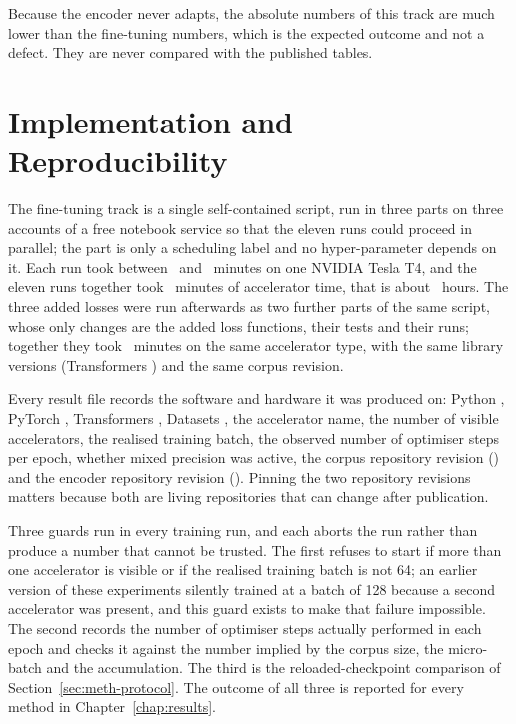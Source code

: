 Because the encoder never adapts, the absolute numbers of this track are much lower than the
fine-tuning numbers, which is the expected outcome and not a defect. They are never compared
with the published tables.

\section{Implementation and Reproducibility}
\label{sec:meth-impl}

The fine-tuning track is a single self-contained script, run in three parts on three accounts
of a free notebook service so that the eleven runs could proceed in parallel; the part is only
a scheduling label and no hyper-parameter depends on it. Each run took between \minAll\ and
\maxAll\ minutes on one NVIDIA Tesla T4, and the eleven runs together took \totalMinutes\
minutes of accelerator time, that is about \totalHours\ hours. The three added losses were run
afterwards as two further parts of the same script, whose only changes are the added loss
functions, their tests and their runs; together they took \nlTotalMinutes\ minutes on the same
accelerator type, with the same library versions (Transformers \nlTfVersion) and the same corpus
revision.

Every result file records the software and hardware it was produced on: Python
\pythonVersion, PyTorch \torchVersion, Transformers \tfVersion, Datasets \datasetsVersion, the
accelerator name, the number of visible accelerators, the realised training batch, the observed
number of optimiser steps per epoch, whether mixed precision was active, the corpus repository
revision (\datasetSha) and the encoder repository revision (\modelSha). Pinning the two
repository revisions matters because both are living repositories that can change after
publication.

Three guards run in every training run, and each aborts the run rather than produce a number
that cannot be trusted. The first refuses to start if more than one accelerator is visible or
if the realised training batch is not 64; an earlier version of these experiments silently
trained at a batch of 128 because a second accelerator was present, and this guard exists to
make that failure impossible. The second records the number of optimiser steps actually
performed in each epoch and checks it against the number implied by the corpus size, the
micro-batch and the accumulation. The third is the reloaded-checkpoint comparison of
Section~\ref{sec:meth-protocol}. The outcome of all three is reported for every method in
Chapter~\ref{chap:results}.

